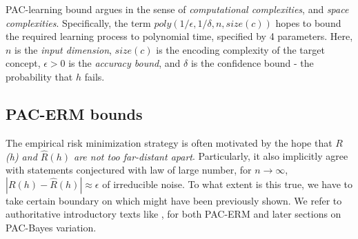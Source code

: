 PAC-learning bound argues in the sense of \textit{computational complexities}, and \textit{space complexities}. Specifically, the term $poly(1/\epsilon,1/\delta,n,size(c))$ hopes to bound the required learning process to polynomial time, specified by 4 parameters. Here, $n$ is the \textit{input dimension}, $size(c)$ is the encoding complexity of the target concept, $\epsilon>0$ is the \textit{accuracy bound}, and $\delta$ is the confidence bound - the probability that $h$ fails.

\subsection{PAC-ERM bounds}

The empirical risk minimization strategy is often motivated by the hope that \textit{$R$(h) and $\hat{R}(h)$ are not too far-distant apart}. Particularly, it also implicitly agree with statements conjectured with law of large number, for $n\to\infty$, $|R(h)-\hat{R}(h)|\approx \epsilon$ of irreducible noise. To what extent is this true, we have to take certain boundary on which might have been previously shown. We refer to authoritative introductory texts like \cite{Alquier_2024}, for both PAC-ERM and later sections on PAC-Bayes variation. 

